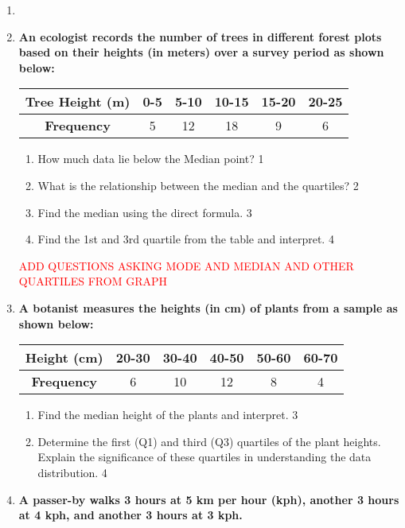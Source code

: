 \documentclass[a4paper,oneside]{book}
\begin{document}
\begin{enumerate}
  
   \item
	  \item
\textbf{An ecologist records the number of trees in different forest plots based on their heights (in meters) over a survey period as shown below:}

\begin{table}[h]
\centering
\begin{tabular}{c|c|c|c|c|c}
\textbf{Tree Height (m)} & 0-5 & 5-10 & 10-15 & 15-20 & 20-25 \\ \hline
\textbf{Frequency}       & 5   & 12   & 18    & 9     & 6      
\end{tabular}
\end{table}

  
  \begin{enumerate}
    \item
	How much data lie below the Median point? \hfill 1
    \item
	What is the relationship between the median and the quartiles? \hfill 2
    \item  
	Find the median using the direct formula. \hfill 3
    \item
	Find the 1st and 3rd quartile from the table and interpret. \hfill 4
  \end{enumerate}
  
  \textcolor{red}{ADD QUESTIONS ASKING MODE AND MEDIAN AND OTHER QUARTILES FROM GRAPH}

\item
\textbf{A botanist measures the heights (in cm) of plants from a sample as shown below:}

\begin{table}[h]
\centering
\begin{tabular}{c|c|c|c|c|c}
\textbf{Height (cm)} & 20-30 & 30-40 & 40-50 & 50-60 & 60-70 \\ \hline
\textbf{Frequency} & 6 & 10 & 12 & 8 & 4
\end{tabular}
\end{table}

\begin{enumerate}
    \item  
    Find the median height of the plants and interpret. \hfill 3
    \item
    Determine the first (Q1) and third (Q3) quartiles of the plant heights. Explain the significance of these quartiles in understanding the data distribution. \hfill 4
\end{enumerate}

  
   \item
	  \textbf{A passer-by walks 3 hours at 5 km per hour (kph), another 3 hours 
	  at 4 kph, and another 3 hours at 3 kph.} 
  

\end{enumerate}
\end{document}
